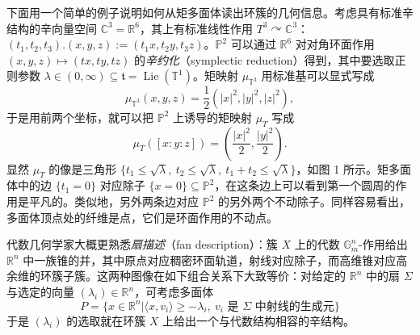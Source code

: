 
\begin{figure}[htbp]
\centering
{}
\end{figure}
\begin{example*}
下面用一个简单的例子说明如何从矩多面体读出环簇的几何信息。考虑具有标准辛结构的辛向量空间 $\mathbb{C}^3=\mathbb{R}^6$，其上有标准线性作用 $T^3\curvearrowright\mathbb{C}^3$：$(t_1, t_2, t_3).(x,y,z):=(t_1 x,t_2y,t_3z)$。$\mathbb{P}^2$ 可以通过 $\mathbb{R}^6$ 对对角环面作用 $(x,y,z)\mapsto (tx,ty,tz)$ 的\emph{辛约化}（symplectic reduction）得到，其中要选取正则参数 $\lambda\in (0,\infty)\subseteq\mathfrak{t}=\operatorname{Lie} (\mathbb{T}^1)$。矩映射 $\mu_{\mathbb{T}^3}$ 用标准基可以显式写成
\[
  \mu_{\mathbb{T}^3} (x,y,z)=\frac{1}{2} (|x|^2,|y|^2,|z|^2),
\]
于是用前两个坐标，就可以把 $\mathbb{P}^2$ 上诱导的矩映射 $\mu_{T}$ 写成
\[
  \mu_{T} ([x:y:z])=\left(\frac{|x|^2}{2},\frac{|y|^2}{2}\right).
\]
显然 $\mu_T$ 的像是三角形 $\{t_1\leq\sqrt{\lambda},\ t_2\leq\sqrt{\lambda},\ t_1+t_2\leq\sqrt{\lambda}\}$，如图 1 所示。矩多面体中的边 $\{t_1=0\}$ 对应除子 $\{x=0\}\subseteq\mathbb{P}^2$，在这条边上可以看到第一个圆周的作用是平凡的。类似地，另外两条边对应 $\mathbb{P}^2$ 的另外两个不动除子。同样容易看出，多面体顶点处的纤维是点，它们是环面作用的不动点。
\end{example*}



\begin{remark*}
代数几何学家大概更熟悉\emph{扇描述}（fan description）：簇 $X$ 上的代数 $\mathbb{G}_m^n$-作用给出 $\mathbb{R}^n$ 中一族锥的并，其中原点对应稠密环面轨道，射线对应除子，而高维锥对应高余维的环簇子簇。这两种图像在如下组合关系下大致等价：对给定的 $\mathbb{R}^n$ 中的扇 $\Sigma$ 与选定的向量 $(\lambda_i)\in\mathbb{R}^n$，可考虑多面体
\[
  P=\{x\in\mathbb{R}^n\vert \langle x,v_i\rangle\geq -\lambda_i,\ v_i\text{ 是 }\Sigma\text{ 中射线的生成元}\}
\]
于是 $(\lambda_i)$ 的选取就在环簇 $X$ 上给出一个与代数结构相容的辛结构。
\end{remark*}

